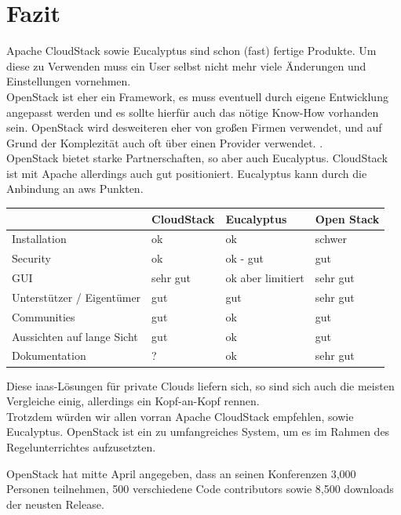 \documentclass[a4paper,nochapterprefix,english,12pt]{scrreprt}
\begin{document}
\chapter{Fazit} \thispagestyle{fancy}
Apache CloudStack sowie Eucalyptus sind schon (fast) fertige Produkte. Um diese zu Verwenden muss ein User selbst nicht mehr viele Änderungen und Einstellungen vornehmen.\\
OpenStack ist eher ein Framework, es muss eventuell durch eigene Entwicklung angepasst werden und es sollte hierfür auch das nötige Know-How vorhanden sein.\cite{OSundAVerg} OpenStack wird desweiteren eher von großen Firmen verwendet, und auf Grund der Komplezität auch oft über einen Provider verwendet. \cite{allthreeverg}. \\
OpenStack bietet starke Partnerschaften, so aber auch Eucalyptus. CloudStack ist mit Apache allerdings auch gut positioniert. Eucalyptus kann durch die Anbindung an \gls{aws} Punkten.
\begin{table}[h]
\begin{tabular}{|p{}|p{}|p{}|p{}|}
\hline
 & \textbf{CloudStack} & \textbf{Eucalyptus} & \textbf{Open Stack} \\ \hline
Installation  &  ok  & ok & schwer   \\
Security  & ok & ok - gut &         gut            \\ 
GUI  &  sehr gut  & ok aber limitiert&      sehr gut          \\ 
Unterstützer / Eigentümer  & gut & gut & sehr gut \\ 
Communities  & gut & ok & gut  \\ 
Aussichten auf lange Sicht  & gut & ok & gut \\ 
Dokumentation & ? & ok &  sehr gut \\ 
\hline
\end{tabular}
\end{table}
Diese \gls{iaas}-Lösungen für private Clouds liefern sich, so sind sich auch die meisten Vergleiche einig, allerdings ein Kopf-an-Kopf rennen. \\
Trotzdem würden wir allen vorran Apache CloudStack empfehlen, sowie Eucalyptus. \cite{allthreeverg}
OpenStack ist ein zu umfangreiches System, um es im Rahmen des Regelunterrichtes aufzusetzten.



OpenStack hat mitte April angegeben, dass an seinen Konferenzen 3,000 Personen teilnehmen, 500 verschiedene Code contributors sowie 8,500 downloads der neusten Release. \cite{allthreeverg}



 


 \thispagestyle{fancy}
 \thispagestyle{fancy}

\listoffigures \thispagestyle{fancy}

\printglossary[style=tree,title={Glossar}]  \thispagestyle{fancy}

\label{lastpage}
\end{document}
